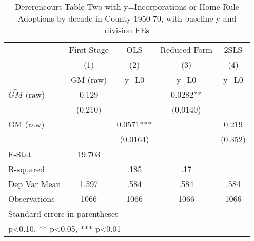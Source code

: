 \begin{table}[htbp]\centering
\def\sym#1{\ifmmode^{#1}\else\(^{#1}\)\fi}
\caption{Dererencourt Table Two with y=Incorporations or Home Rule Adoptions by decade in County 1950-70, with baseline y and division FEs}
\begin{tabular}{l*{4}{c}}
\toprule
                    & First Stage   &         OLS   &Reduced Form   &        2SLS   \\
                    &\multicolumn{1}{c}{(1)}&\multicolumn{1}{c}{(2)}&\multicolumn{1}{c}{(3)}&\multicolumn{1}{c}{(4)}\\
                    &\multicolumn{1}{c}{GM  (raw)}&\multicolumn{1}{c}{y\_L0}&\multicolumn{1}{c}{y\_L0}&\multicolumn{1}{c}{y\_L0}\\
\midrule
$\hat{GM}$ (raw)    &       0.129   &               &      0.0282** &               \\
                    &     (0.210)   &               &    (0.0140)   &               \\
\addlinespace
GM  (raw)           &               &      0.0571***&               &       0.219   \\
                    &               &    (0.0164)   &               &     (0.352)   \\
\midrule
F-Stat              &      19.703   &               &               &               \\
R-squared           &               &        .185   &         .17   &               \\
Dep Var Mean        &       1.597   &        .584   &        .584   &        .584   \\
Observations        &        1066   &        1066   &        1066   &        1066   \\
\bottomrule
\multicolumn{5}{l}{\footnotesize Standard errors in parentheses}\\
\multicolumn{5}{l}{\footnotesize * p<0.10, ** p<0.05, *** p<0.01}\\
\end{tabular}
\end{table}
